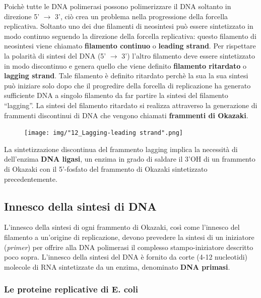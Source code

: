 \documentclass[11pt]{book}
\begin{document}
Poichè tutte le DNA polimerasi possono polimerizzare il DNA soltanto in
direzione 5' \(\rightarrow\) 3', ciò crea un problema nella progressione
della forcella replicativa. Soltanto uno dei due filamenti di neosintesi
può essere sintetizzato in modo continuo seguendo la direzione della
forcella replicativa: questo filamento di neosintesi viene chiamato
\textbf{filamento continuo} o \textbf{leading strand}. Per rispettare la
polarità di sintesi del DNA (5' \(\rightarrow\) 3') l'altro filamento
deve essere sintetizzato in modo discontinuo e genera quello che viene
definito \textbf{filamento ritardato} o \textbf{lagging strand}. Tale
filamento è definito ritardato perchè la sua la sua sintesi può iniziare
solo dopo che il progredire della forcella di replicazione ha generato
sufficiente DNA a singolo filamento da far partire la sintesi del
filamento ``lagging''. La sintesi del filamento ritardato si realizza
attraverso la generazione di frammenti discontinui di DNA che vengono
chiamati \textbf{frammenti di Okazaki}.

\clearpage
\begin{figure}[htp]
\centering
\texttt{[image: img/"12\_Lagging-leading strand".png]}
\caption{}
\label{lagging-leading-strand}
\end{figure}

La sintetizzazione discontinua del frammento lagging implica la
necessità di dell'enzima \textbf{DNA ligasi}, un enzima in grado di
saldare il 3'OH di un frammento di Okazaki con il 5'-fosfato del
frammento di Okazaki sintetizzato precedentemente.

\subsection{Innesco della sintesi di
DNA}\label{innesco-della-sintesi-di-dna}

L'innesco della sintesi di ogni frammento di Okazaki, così come
l'innesco del filamento a un'origine di replicazione, devono prevedere
la sintesi di un iniziatore (\emph{primer}) per offrire alla DNA
polimerasi il complesso stampo-iniziatore descritto poco sopra.
L'innesco della sintesi del DNA è fornito da corte (4-12 nucleotidi)
molecole di RNA sintetizzate da un enzima, denominato \textbf{DNA
primasi}.

\clearpage
\subsubsection{Le proteine replicative di E.
coli}\label{le-proteine-replicative-di-e.-coli}
\end{document}
